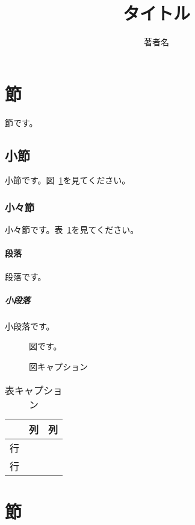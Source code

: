 \documentclass{jsarticle}
\title{タイトル}
\author{著者名}
\begin{document}
\maketitle

\section{節}

節です\cite{1}。

\subsection{小節}

小節です。図~\ref{f1}を見てください。

\subsubsection{小々節}

小々節です。表~\ref{t1}を見てください。

\paragraph{段落}

段落です。

\subparagraph{小段落}

小段落です。

\begin{figure}[tb]
\begin{center}
図です。
\end{center}
\caption{図キャプション}
\label{f1}
\end{figure}

\begin{table}[tb]
\caption{表キャプション}
\label{t1}
\begin{center}
\begin{tabular}{c|cc}
\hline
 & 列 & 列\\
\hline
行 & & \\
行 & & \\
\hline
\end{tabular}
\end{center}
\end{table}

\section{節}

\subsection{}
\end{document}
